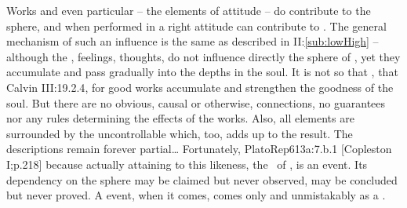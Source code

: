 Works and even particular  -- the elements of  attitude
-- do contribute to the  sphere, and when performed in a right
attitude can contribute to \yes.  The general mechanism of such an influence is
the same as described in II:\ref{sub:lowHigh} -- although the , feelings, thoughts,  do not influence directly the
sphere of , yet they accumulate and pass gradually into the
 depths in the soul. It is not so that , that
\citet{every work they attempt is accursed}{Calvin}{ III:19.2.4}, for good works
accumulate and strengthen the goodness of the soul. But there are no obvious,
causal or otherwise, connections, no guarantees nor any  rules
determining the  effects of the  works. Also, all
 elements are surrounded by the uncontrollable  which, too,
adds up to the result. The descriptions remain forever partial\ldots
Fortunately, \citet{the gods have a care of anyone whose desire is to become
  just and to be like God, as far as man can attain to the divine likeness by
  the pursuit of virtue.}{PlatoRep}{613a:7.b.1 [Copleston I;p.218]}  because actually attaining to this likeness, the \sch\ of
\yes, is an  event. Its dependency on the 
sphere may be claimed but never observed, may be concluded but
never proved. A  event, when it comes, comes only and unmistakably
as a .

